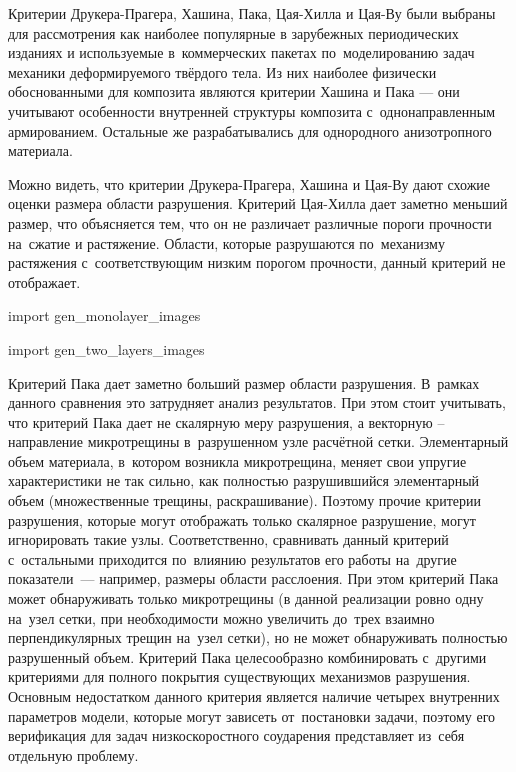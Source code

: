 \documentclass[thesis.tex]{subfiles}
\begin{document}
Критерии Друкера-Прагера, Хашина, Пака, Цая-Хилла и Цая-Ву были выбраны для рассмотрения как наиболее популярные в
зарубежных периодических изданиях и используемые в~коммерческих пакетах по~моделированию задач механики деформируемого
твёрдого тела. Из них наиболее физически обоснованными для композита являются критерии Хашина и Пака --- они учитывают
особенности внутренней структуры композита с~однонаправленным армированием. Остальные же разрабатывались для однородного
анизотропного материала.

Можно видеть, что критерии Друкера-Прагера, Хашина и Цая-Ву дают схожие оценки размера области разрушения. Критерий
Цая-Хилла дает заметно меньший размер, что объясняется тем, что он не различает различные пороги прочности на~сжатие и
растяжение. Области, которые разрушаются по~механизму растяжения с~соответствующим низким порогом прочности, данный
критерий не отображает.

\begin{python}
     import gen_monolayer_images
\end{python}

\begin{python}
     import gen_two_layers_images
\end{python}

\clearpage

Критерий Пака дает заметно больший размер области разрушения. В~рамках данного сравнения это затрудняет анализ
результатов. При этом стоит учитывать, что критерий Пака дает не скалярную меру разрушения, а векторную – направление
микротрещины в~разрушенном узле расчётной сетки. Элементарный объем материала, в~котором возникла микротрещина, меняет
свои упругие характеристики не так сильно, как полностью разрушившийся элементарный объем (множественные трещины,
раскрашивание). Поэтому прочие критерии разрушения, которые могут отображать только скалярное разрушение, могут
игнорировать такие узлы. Соответственно, сравнивать данный критерий с~остальными приходится по~влиянию результатов его
работы на~другие показатели~--- например, размеры области расслоения. При этом критерий Пака может обнаруживать только
микротрещины (в данной реализации ровно одну на~узел сетки, при необходимости можно увеличить до~трех взаимно
перпендикулярных трещин на~узел сетки), но не может обнаруживать полностью разрушенный объем. Критерий Пака
целесообразно комбинировать с~другими критериями для полного покрытия существующих механизмов разрушения. Основным
недостатком данного критерия является наличие четырех внутренних параметров модели, которые могут зависеть от~постановки
задачи, поэтому его верификация для задач низкоскоростного соударения представляет из~себя отдельную проблему.
\end{document}
